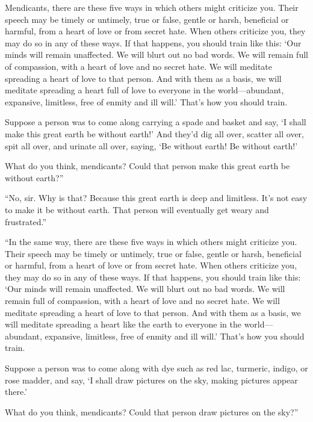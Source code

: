 \documentclass[12pt,openany]{book}%
\begin{document}
Mendicants, there are these five ways in which others might criticize you. Their speech may be timely or untimely, true or false, gentle or harsh, beneficial or harmful, from a heart of love or from secret hate. When others criticize you, they may do so in any of these ways. If that happens, you should train like this: ‘Our minds will remain unaffected. We will blurt out no bad words. We will remain full of compassion, with a heart of love and no secret hate. We will meditate spreading a heart of love to that person. And with them as a basis, we will meditate spreading a heart full of love to everyone in the world—abundant, expansive, limitless, free of enmity and ill will.’ That’s how you should train. 

Suppose a person was to come along carrying a spade and basket and say, ‘I shall make this great earth be without earth!’ And they’d dig all over, scatter all over, spit all over, and urinate all over, saying, ‘Be without earth! Be without earth!’ 

What do you think, mendicants? Could that person make this great earth be without earth?” 

“No, sir. Why is that? Because this great earth is deep and limitless. It’s not easy to make it be without earth. That person will eventually get weary and frustrated.” 

“In the same way, there are these five ways in which others might criticize you. Their speech may be timely or untimely, true or false, gentle or harsh, beneficial or harmful, from a heart of love or from secret hate. When others criticize you, they may do so in any of these ways. If that happens, you should train like this: ‘Our minds will remain unaffected. We will blurt out no bad words. We will remain full of compassion, with a heart of love and no secret hate. We will meditate spreading a heart of love to that person. And with them as a basis, we will meditate spreading a heart like the earth to everyone in the world—abundant, expansive, limitless, free of enmity and ill will.’ That’s how you should train. 

Suppose a person was to come along with dye such as red lac, turmeric, indigo, or rose madder, and say, ‘I shall draw pictures on the sky, making pictures appear there.’ 

What do you think, mendicants? Could that person draw pictures on the sky?” 
\end{document}
